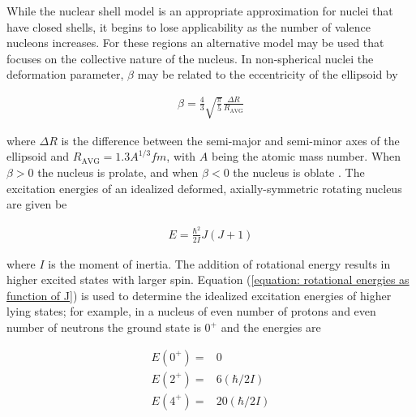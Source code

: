 While the nuclear shell model is an appropriate approximation for nuclei that have closed shells, it begins to lose applicability as the number of valence nucleons increases. For these regions an alternative model may be used that focuses on the collective nature of the nucleus. In non-spherical nuclei the deformation parameter, $\beta$ may be related to the eccentricity of the ellipsoid by

\begin{gather}
\beta = \frac{4}{3}\sqrt{\frac{\pi}{5}}\frac{\Delta R}{R_{\mathrm{AVG}}}
\label{equation: beta and spheroids}
\end{gather}

where $\Delta R$ is the difference between the semi-major and semi-minor axes of the ellipsoid and $R_\mathrm{AVG}=1.3A^{1/3} \si{fm}$, with $A$ being the atomic mass number. When $\beta>0$ the nucleus is prolate, and when $\beta<0$ the nucleus is oblate \cite{KraneText}. The excitation energies of an idealized deformed, axially-symmetric rotating nucleus are given be

\begin{gather}
E = \frac{\hbar^2}{2I}J(J+1)
\label{equation: rotational energies as function of J}
\end{gather}

where $I$ is the moment of inertia. The addition of rotational energy results in higher excited states with larger spin. Equation (\ref{equation: rotational energies as function of J}) is used to determine the idealized excitation energies of higher lying states; for example, in a nucleus of even number of protons and even number of neutrons the ground state is $0^+$ and the energies are

\begin{equation}
\begin{aligned}
E(0^+) ={} & 0 \\
E(2^+) ={} & 6(\hbar/2I) \\
E(4^+) ={} & 20(\hbar/2I)
\label{equation: three rotational energies calculated}
\end{aligned}
\end{equation}

